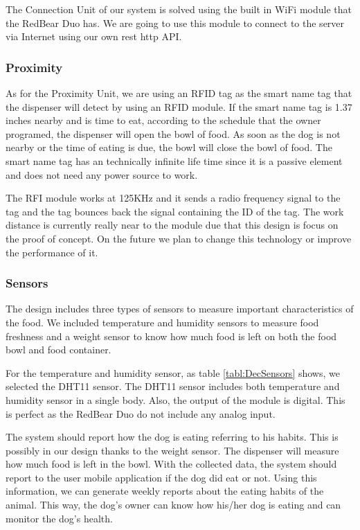 \documentclass[12pt]{article}
\begin{document}
The Connection Unit of our system is solved using the built in WiFi module that the RedBear Duo has. We are going to use this module to connect to the server via Internet using our own rest http API.

\subsubsection{Proximity}
\label{sec:proximity}

As for the Proximity Unit, we are using an RFID tag\cite{Stuff} as the smart name tag that the dispenser will detect by using an RFID module. If the smart name tag is 1.37 inches nearby and is time to eat, according to the schedule that the owner programed, the dispenser will open the bowl of food. As soon as the dog is not nearby or the time of eating is due, the bowl will close the bowl of food. The smart name tag has an technically infinite life time since it is a passive element and does not need any power source to work.

The RFI module works at 125KHz and it sends a radio frequency signal to the tag and the tag bounces back the signal containing the ID of the tag. The work distance is currently really near to the module due that this design is focus on the proof of concept. On the future we plan to change this technology or improve the performance of it.



\subsubsection{Sensors}

The design includes three types of sensors to measure important characteristics of the food. We included temperature and humidity sensors to measure food freshness and a weight sensor to know how much food is left on both the food bowl and food container.

For the temperature and humidity sensor, as table \ref{tabl:DecSensors} shows, we selected the DHT11 sensor. The DHT11 sensor includes both temperature and humidity sensor in a single body. Also, the output of the module is digital. This is perfect as the RedBear Duo do not include any analog input.

The system should report how the dog is eating referring to his habits. This is possibly in our design thanks to the weight sensor. The dispenser will measure how much food is left in the bowl. With the collected data, the system should report to the user mobile application if the dog did eat or not. Using this information, we can generate weekly reports about the eating habits of the animal. This way, the dog's owner can know how his/her dog is eating and can monitor the dog's health.
\end{document}
